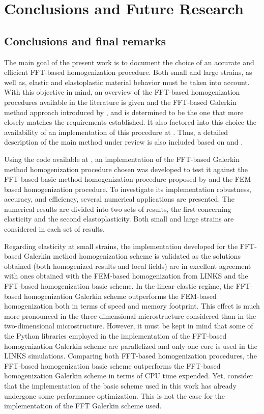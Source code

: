 \chapter{Conclusions and Future Research} \label{chapter:conclusions}

\section{Conclusions and final remarks}

The main goal of the present work is to document the choice of an accurate and efficient FFT-based homogenization procedure.
Both small and large strains, as well as, elastic and elastoplastic material behavior must be taken into account.
With this objective in mind, an overview of the FFT-based homogenization procedures available in the literature is given and the FFT-based Galerkin method approach introduced by \cite{vondrejc_fft-based_2014}, \cite{zeman_finite_2017} and \cite{de_geus_finite_2017} is determined to be the one that more closely matches the requirements established.
It also factored into this choice the availability of an implementation of this procedure at \cite{de_geus_notitle_nodate}.
Thus, a detailed description of the main method under review is also included based on \cite{zeman_finite_2017} and \cite{de_geus_finite_2017}.

Using the code available at \cite{de_geus_notitle_nodate}, an implementation of the FFT-based Galerkin method homogenization procedure chosen was developed to test it against the FFT-based basic method homogenization procedure proposed by \cite{moulinec_fast_1994} and the FEM-based homogenization procedure.
To investigate its implementation robustness, accuracy, and efficiency, several numerical applications are presented.
The numerical results are divided into two sets of results, the first concerning elasticity and the second elastoplasticity.
Both small and large strains are considered in each set of results.

Regarding elasticity at small strains, the implementation developed for the FFT-based Galerkin method homogenization scheme is validated as the solutions obtained (both homogenized results and local fields) are in excellent agreement with ones obtained with the FEM-based homogenization from LINKS and the FFT-based homogenization basic scheme.
In the linear elastic regime, the FFT-based homogenization Galerkin scheme outperforms the FEM-based homogenization both in terms of speed and memory footprint.
This effect is much more pronounced in the three-dimensional microstructure considered than in the two-dimensional microstructure.
However, it must be kept in mind that some of the Python libraries employed in the implementation of the FFT-based homogenization Galerkin scheme are parallelized and only one core is used in the LINKS simulations.
Comparing both FFT-based homogenization procedures, the FFT-based homogenization basic scheme outperforms the FFT-based homogenization Galerkin scheme in terms of CPU time expended.
Yet, consider that the implementation of the basic scheme used in this work \citep{ferreira_accurate_2020} has already undergone some performance optimization.
This is not the case for the implementation of the FFT Galerkin scheme used.

